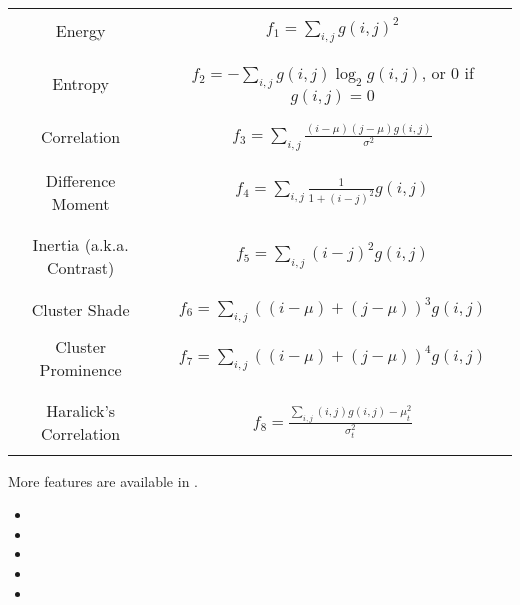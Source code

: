 \begin{table}
\begin{center}
\begin{tabular}{|c|c|}
\hline
& \\
Energy & $ f_1 = \sum_{i,j}g(i, j)^2 $ \\
& \\
\hline
& \\
Entropy & $ f_2 = -\sum_{i,j}g(i, j) \log_2 g(i, j)$, or 0 if $g(i, j) = 0$ \\
& \\
\hline
& \\
Correlation & $ f_3 = \sum_{i,j}\frac{(i - \mu)(j - \mu)g(i, j)}{\sigma^2} $ \\
& \\
\hline
& \\
Difference Moment &  $f_4 = \sum_{i,j}\frac{1}{1 + (i - j)^2}g(i, j) $ \\
& \\
\hline
& \\
Inertia (a.k.a. Contrast) & $ f_5 = \sum_{i,j}(i - j)^2g(i, j) $ \\
& \\
\hline
& \\
Cluster Shade & $ f_6 = \sum_{i,j}((i - \mu) + (j - \mu))^3 g(i, j) $ \\
& \\
\hline
Cluster Prominence & $ f_7 = \sum_{i,j}((i - \mu) + (j - \mu))^4 g(i, j) $ \\
& \\
\hline
& \\
Haralick's Correlation & $ f_8 = \frac{\sum_{i,j}(i, j) g(i, j) -\mu_t^2}{\sigma_t^2} $ \\
& \\
\hline
\end{tabular}
\end{center}
\label{tab:haralickStandardFeatures}
\end{table}

More features are available in .
\relatedClasses
\begin{itemize}
\item {}
\item {}
\item {}
\item {}
\item {}
\end{itemize}

